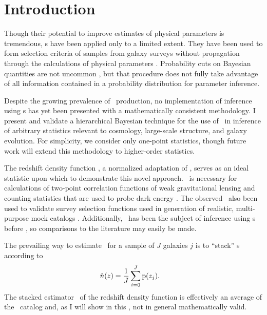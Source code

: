 \section{Introduction}

Though their potential to improve estimates of physical parameters is tremendous, \pzpdf s have been applied only to a limited extent.  
They have been used to form selection criteria of samples from galaxy surveys without propagation 
through the calculations of physical parameters \citep{VanBreukelen2009,Viironen2015}.  
Probability cuts on Bayesian quantities are not uncommon \citep{Leung2015, DiPompeo2015a}, but that procedure does not fully take advantage of all information contained in a probability distribution for parameter inference.  

Despite the growing prevalence of \pzpdf\ production, no implementation of inference using \pzpdf s has yet been presented with a mathematically consistent methodology.  
I present and validate a hierarchical Bayesian technique for the use of \pzpdf\ in inference of arbitrary statistics relevant to cosmology, large-scale structure, and galaxy evolution.  
For simplicity, we consider only one-point statistics, though future work will extend this methodology to higher-order statistics.

The redshift density function \nz, a normalized adaptation of , serves as an ideal statistic upon which to demonstrate this novel approach.  
\Nz\ is necessary for calculations of two-point correlation functions of weak gravitational lensing and counting statistics that are used to probe dark energy \citep{Masters2015}.  
The observed \Nz\ also been used to validate survey selection functions used in generation of realistic, multi-purpose mock catalogs \citep{Norberg2002}.  
Additionally, \Nz\ has been the subject of inference using \pzpdf s before \citep{Sheldon2012, Hildebrandt2012, Kelly2014, Benjamin2013, Bonnett2015a, Viironen2015, Asorey2016, Leistedt2016}, so comparisons to the literature may easily be made. 

The prevailing way to estimate \nz\ for a sample of $J$ galaxies $j$ is to ``stack'' \pzpdf s according to
\begin{align}
\eqlabel{eqn:stackwithdata}
\hat{n}(z) &= \frac{1}{J} \sum_{i = 0}^{J} \pr{z_{j}} .
\end{align}
The stacked estimator \nz\ of the redshift density function is effectively an average of the \pzpdf\ catalog and, as I will show in this \Chap, not in general mathematically valid.

